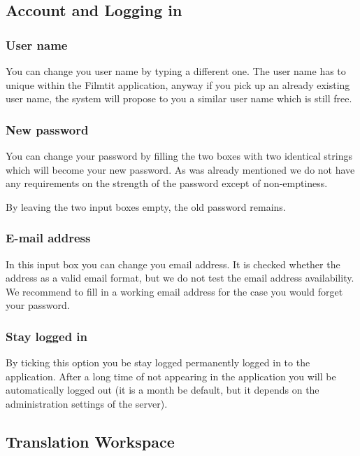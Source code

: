 \subsection{Account and Logging in}
\subsubsection{User name}

You can change you user name by typing a different one. The user name has to unique within the Filmtit application, anyway if you pick up an already existing user name, the system will propose to you a similar user name which is still free.

\subsubsection{New password}

You can change your password by filling the two boxes with two identical strings which will become your new password. As was already mentioned we do not have any requirements on the strength of the password except of non-emptiness. 

By leaving the two input boxes empty, the old password remains.

\subsubsection{E-mail address}

In this input box you can change you email address. It is checked whether the address as a valid email format, but we do not test the email address availability. We recommend to fill in a working email address for the case you would forget your password.

\subsubsection{Stay logged in}

By ticking this option you be stay logged permanently logged in to the application. After a long time of not appearing in the application you will be automatically logged out (it is a month be default, but it depends on the administration settings of the server).

\subsection{Translation Workspace}

